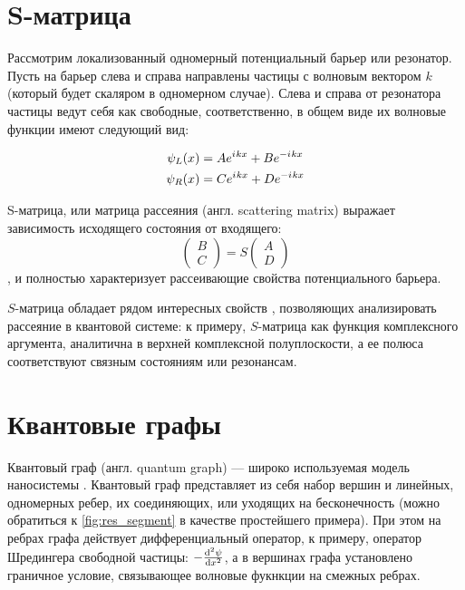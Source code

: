 \section{S-матрица}
Рассмотрим локализованный одномерный потенциальный барьер или резонатор. Пусть на барьер слева и справа направлены частицы с волновым вектором $k$ (который будет скаляром в одномерном случае). Слева и справа от резонатора частицы ведут себя как свободные, соответственно, в общем виде их волновые функции имеют следующий вид:

\begin{equation}\label{eq:wlwl}
\begin{aligned}
   \psi_L(x) &= A e^{{i\mkern1mu} k x} + B e^{-{i\mkern1mu} k x}
\\ \psi_R(x) &= C e^{{i\mkern1mu} k x} + D e^{-{i\mkern1mu} k x}
\end{aligned}
\end{equation}

S-матрица, или  матрица рассеяния (англ. scattering matrix) выражает зависимость исходящего состояния от входящего:
\begin{equation}\label{eq:smatrix}
\begin{pmatrix} B \\ C \end{pmatrix} = S \begin{pmatrix} A \\ D \end{pmatrix}
\end{equation}
, и полностью характеризует рассеивающие свойства потенциального барьера.

$S$-матрица обладает рядом интересных свойств \cite[стр. 75]{perelomov1998quantum}, позволяющих анализировать рассеяние в квантовой системе: к примеру, $S$-матрица как функция комплексного аргумента, аналитична в верхней комплексной полуплоскости, а ее полюса соответствуют связным состояниям или резонансам.

\section{Квантовые графы}
Квантовый граф (англ. quantum graph) — широко используемая модель наносистемы \cite{kuchment2002graph, lobanov2013genetic, brown2010analysis}. Квантовый граф представляет из себя набор вершин и линейных, одномерных ребер, их соединяющих, или уходящих на бесконечность (можно обратиться к \autoref{fig:res_segment} в качестве простейшего примера). При этом на ребрах графа действует дифференциальный оператор, к примеру, оператор Шредингера свободной частицы: $-\dv[2]{\psi}{x}$, а в вершинах графа установлено граничное условие, связывающее волновые фукнкции на смежных ребрах.


